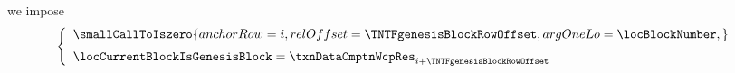\item[\underline{\underline{Detecting the genesis block:}}]
	we impose
	\[
		\left\{ \begin{array}{l}
			\smallCallToIszero {
				anchorRow = i                          ,
				relOffset = \TNTFgenesisBlockRowOffset ,
				argOneLo  = \locBlockNumber            ,
			}
			\vspace{2mm} \\
			\locCurrentBlockIsGenesisBlock
			=
			\txnDataCmptnWcpRes _{i + \TNTFgenesisBlockRowOffset} \\
		\end{array} \right.
	\]
